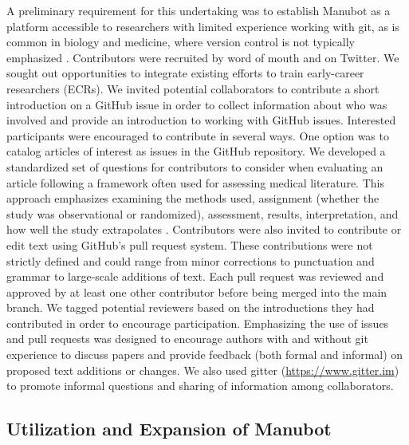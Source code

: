 \documentclass[sigconf]{acmart}
\begin{document}
A preliminary requirement for this undertaking was to establish Manubot as a platform accessible to researchers with limited experience working with git, as is common in biology and medicine, where version control is not typically emphasized \citep{1HmO21gZN, OO1DuZd, 4ny1onB0}.
Contributors were recruited by word of mouth and on Twitter.
We sought out opportunities to integrate existing efforts to train early-career researchers (ECRs).
We invited potential collaborators to contribute a short introduction on a GitHub issue in order to collect information about who was involved and provide an introduction to working with GitHub issues.
Interested participants were encouraged to contribute in several ways.
One option was to catalog articles of interest as issues in the GitHub repository.
We developed a standardized set of questions for contributors to consider when evaluating an article following a framework often used for assessing medical literature.
This approach emphasizes examining the methods used, assignment (whether the study was observational or randomized), assessment, results, interpretation, and how well the study extrapolates \citep{17OQtAY4l}.
Contributors were also invited to contribute or edit text using GitHub's pull request system.
These contributions were not strictly defined and could range from minor corrections to punctuation and grammar to large-scale additions of text.
Each pull request was reviewed and approved by at least one other contributor before being merged into the main branch.
We tagged potential reviewers based on the introductions they had contributed in order to encourage participation.
Emphasizing the use of issues and pull requests was designed to encourage authors with and without git experience to discuss papers and provide feedback (both formal and informal) on proposed text additions or changes.
We also used gitter (\url{https://www.gitter.im}) to promote informal questions and sharing of information among collaborators.

\hypertarget{utilization-and-expansion-of-manubot}{%
\subsection{Utilization and Expansion of Manubot}\label{utilization-and-expansion-of-manubot}}
\end{document}
